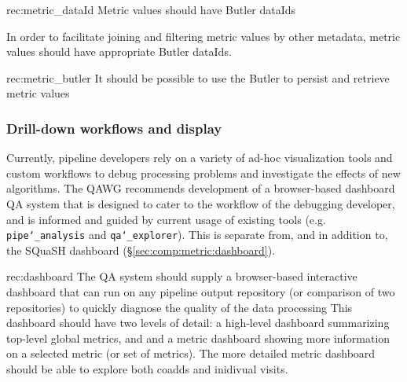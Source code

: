 \begin{recommendation}
    {rec:metric_dataId}
    {Metric values should have Butler dataIds}
\end{recommendation}

In order to facilitate joining and filtering metric values by other metadata, metric values should have appropriate Butler dataIds.

\begin{recommendation}
    {rec:metric_butler}
    {It should be possible to use the Butler to persist and retrieve metric values}
\end{recommendation}

\subsubsection{Drill-down workflows and display} \label{sec:metric_displays}

Currently, pipeline developers rely on a variety of ad-hoc visualization tools and custom workflows to debug processing problems and investigate the effects of new algorithms.
The QAWG recommends development of a browser-based dashboard QA system that is designed to cater to the workflow of the debugging developer, and is informed and guided by current usage of existing tools (e.g. \texttt{pipe\char`_analysis} and \texttt{qa\char`_explorer}).
This is separate from, and in addition to, the SQuaSH dashboard (\S \ref{sec:comp:metric:dashboard}).

\begin{recommendation}
    {rec:dashboard}
    {The QA system should supply a browser-based interactive dashboard that can run on any pipeline output repository (or comparison of two repositories) to quickly diagnose the quality of the data processing}
This dashboard should have two levels of detail: a high-level dashboard summarizing top-level global metrics, and and a metric dashboard showing more information on a selected metric (or set of metrics).  The more detailed metric dashboard should be able to explore both coadds and inidivual visits.
\end{recommendation}


